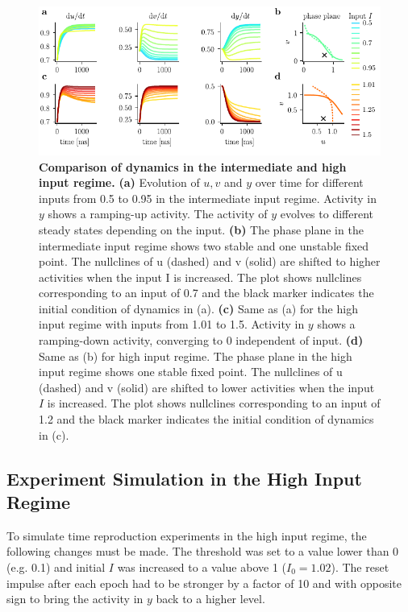 \documentclass[10pt]{article}
\begin{document}
\begin{figure}[ht]
	\centering
	\includegraphics{figures/supp_regimes.pdf}
	\caption{\textbf{Comparison of dynamics in the intermediate and high input regime.} 
	\textbf{(a)} Evolution of $u, v$ and $y$ over time for different inputs from 0.5 to 0.95 in the intermediate input regime. Activity in $y$ shows a ramping-up activity. The activity of $y$ evolves to different steady states depending on the input. 
	\textbf{(b)}  The phase plane in the intermediate input regime shows two stable and one unstable fixed point. The nullclines of u (dashed) and v (solid) are shifted to higher activities when the input I is increased. The plot shows nullclines corresponding to an input of 0.7 and the black marker indicates the initial condition of dynamics in (a).
	\textbf{(c)} Same as (a) for the high input regime with inputs from 1.01 to 1.5. Activity in $y$ shows a ramping-down activity, converging to 0 independent of input.
	\textbf{(d)} Same as (b) for high input regime.  The phase plane in the high input
	regime shows one stable fixed point. The nullclines of u (dashed) and v (solid) are
	shifted to lower activities when the input $I$ is increased. The plot shows nullclines corresponding to an input of 1.2 and the black marker indicates the initial condition of dynamics in (c).
	}
\label{regimes}
\end{figure}

\subsection{Experiment Simulation in the High Input Regime}
To simulate time reproduction experiments in the high input regime, the following changes must be made. 
The threshold was set to a value lower than 0 (e.g. 0.1) and initial $I$ was increased to a value above 1 ($I_0 = 1.02$). The reset impulse after each epoch had to be stronger by a factor of 10 and with opposite sign to bring the activity in $y$ back to a higher level.
\end{document}
